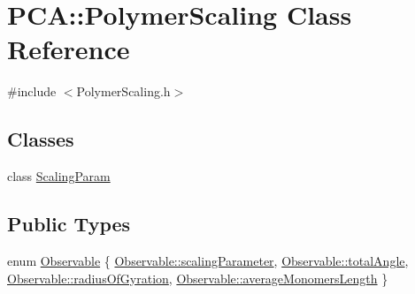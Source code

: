 \hypertarget{class_p_c_a_1_1_polymer_scaling}{}\section{P\+CA\+:\+:Polymer\+Scaling Class Reference}
\label{class_p_c_a_1_1_polymer_scaling}


{\ttfamily \#include $<$Polymer\+Scaling.\+h$>$}

\subsection*{Classes}
\begin{DoxyCompactItemize}
\item 
class \hyperlink{class_p_c_a_1_1_polymer_scaling_1_1_scaling_param}{Scaling\+Param}
\end{DoxyCompactItemize}
\subsection*{Public Types}
\begin{DoxyCompactItemize}
\item 
enum \hyperlink{class_p_c_a_1_1_polymer_scaling_aa4112660455a10f29c208c96655718c0}{Observable} \{ \hyperlink{class_p_c_a_1_1_polymer_scaling_aa4112660455a10f29c208c96655718c0acfb5418d931d8d22420f6c47a22da603}{Observable\+::scaling\+Parameter}, 
\hyperlink{class_p_c_a_1_1_polymer_scaling_aa4112660455a10f29c208c96655718c0a1aa2ef7ad0fe7fe833729f2241ba944e}{Observable\+::total\+Angle}, 
\hyperlink{class_p_c_a_1_1_polymer_scaling_aa4112660455a10f29c208c96655718c0adf22918d9c11ad9d09982e92c8092123}{Observable\+::radius\+Of\+Gyration}, 
\hyperlink{class_p_c_a_1_1_polymer_scaling_aa4112660455a10f29c208c96655718c0add15ab7b58b9389187c6075211fbf198}{Observable\+::average\+Monomers\+Length}
 \}
\end{DoxyCompactItemize}
